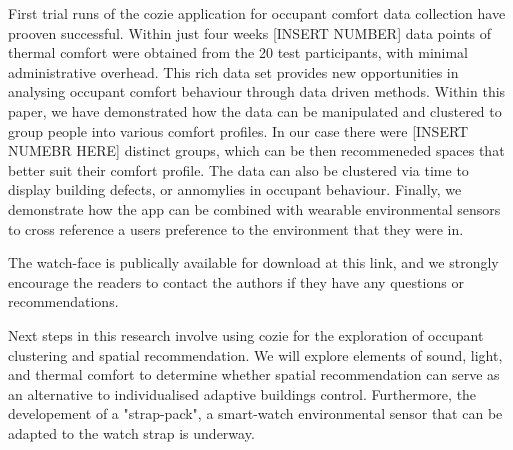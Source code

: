
First trial runs of the cozie application for occupant comfort data collection have prooven successful. Within just four weeks [INSERT NUMBER] data points of thermal comfort were obtained from the 20 test participants, with minimal administrative overhead. This rich data set provides new opportunities in analysing occupant comfort behaviour through data driven methods. Within this paper, we have demonstrated how the data can be manipulated and clustered to group people into various comfort profiles. In our case there were [INSERT NUMEBR HERE] distinct groups, which can be then recommeneded spaces that better suit their comfort profile. The data can also be clustered via time to display building defects, or annomylies in occupant behaviour. Finally, we demonstrate how the app can be combined with wearable environmental sensors to cross reference a users preference to the environment that they were in.

The watch-face is publically available for download at this link, and we strongly encourage the readers to contact the authors if they have any questions or recommendations.

Next steps in this research involve using cozie for the exploration of occupant clustering and spatial recommendation. We will explore elements of sound, light, and thermal comfort to determine whether spatial recommendation can serve as an alternative to individualised adaptive buildings control. Furthermore, the developement of a "strap-pack", a smart-watch environmental sensor that can be adapted to the watch strap is underway. 